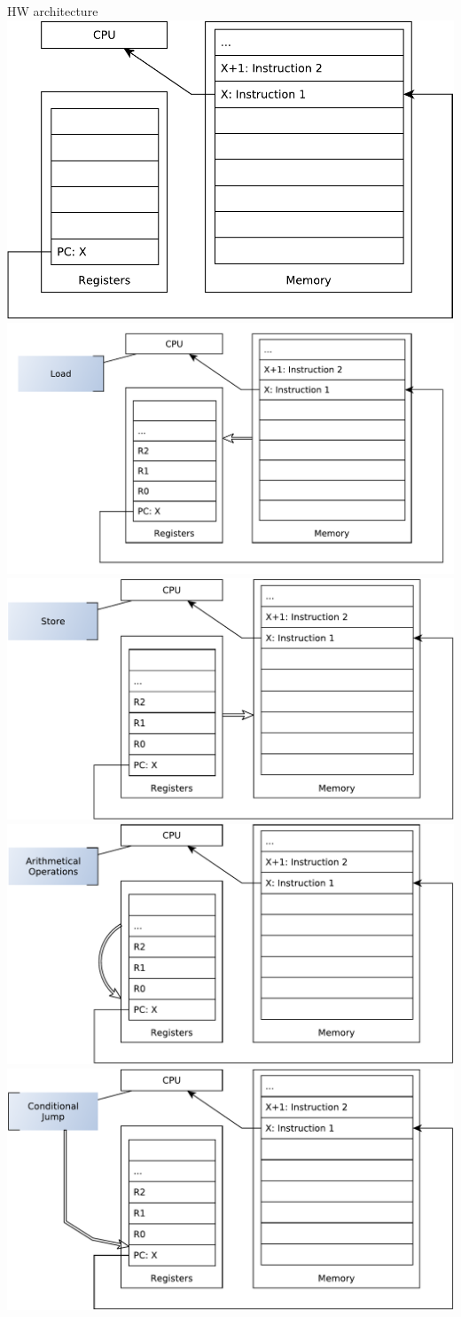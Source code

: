 \documentclass{beamer}
\begin{document}
\begin{frame}[t]{HW architecture}
{{}
     {
  \includegraphics[width=0.5\linewidth]{hw-4}
}
     {
  \includegraphics[width=0.7\linewidth]{hw-5}
}
     {
  \includegraphics[width=0.7\linewidth]{hw-6}
}
     {
  \includegraphics[width=0.7\linewidth]{hw-7}
}
     {
  \includegraphics[width=0.7\linewidth]{hw-8}
}}
\end{frame}
\end{document}
